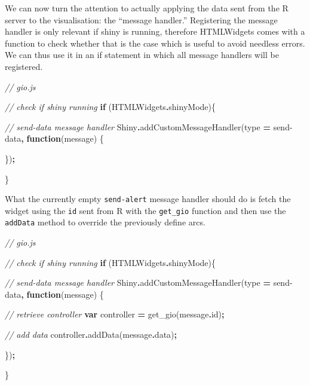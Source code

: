 \documentclass[
]{krantz}
\makeatletter
\newenvironment{Shaded}{\begin{snugshade}}{\end{snugshade}}
\newcommand{\AttributeTok}[1]{\textcolor[rgb]{0.61,0.61,0.61}{#1}}
\newcommand{\CommentTok}[1]{\textcolor[rgb]{0.37,0.37,0.37}{\textit{#1}}}
\newcommand{\ControlFlowTok}[1]{\textcolor[rgb]{0.27,0.27,0.27}{\textbf{#1}}}
\newcommand{\FunctionTok}[1]{\textcolor[rgb]{0,0,0}{#1}}
\newcommand{\KeywordTok}[1]{\textcolor[rgb]{0.27,0.27,0.27}{\textbf{#1}}}
\newcommand{\NormalTok}[1]{#1}
\newcommand{\OperatorTok}[1]{\textcolor[rgb]{0.43,0.43,0.43}{\textbf{#1}}}
\newcommand{\StringTok}[1]{\textcolor[rgb]{0.5,0.5,0.5}{#1}}
\newenvironment{kframe}{%
\medskip{}
\setlength{\fboxsep}{.8em}
 \def\at@end@of@kframe{}%
 \ifinner\ifhmode%
  \def\at@end@of@kframe{\end{minipage}}%
  \begin{minipage}{\columnwidth}%
 \fi\fi%
 \def\FrameCommand##1{\hskip\@totalleftmargin \hskip-\fboxsep
 \colorbox{shadecolor}{##1}\hskip-\fboxsep
     \hskip-\linewidth \hskip-\@totalleftmargin \hskip\columnwidth}%
 \MakeFramed {\advance\hsize-\width
   \@totalleftmargin\z@ \linewidth\hsize
   \@setminipage}}%
 {\par\unskip\endMakeFramed%
 \at@end@of@kframe}
\renewenvironment{Shaded}{\begin{kframe}}{\end{kframe}}
\makeatother
\begin{document}
We can now turn the attention to actually applying the data sent from the R server to the visualisation: the ``message handler.'' Registering the message handler is only relevant if shiny is running, therefore HTMLWidgets comes with a function to check whether that is the case which is useful to avoid needless errors. We can thus use it in an if statement in which all message handlers will be registered.

\begin{Shaded}
\begin{Highlighting}[]
\CommentTok{// gio.js}

\CommentTok{// check if shiny running}
\ControlFlowTok{if}\NormalTok{ (HTMLWidgets}\OperatorTok{.}\AttributeTok{shinyMode}\NormalTok{)\{}

  \CommentTok{// send{-}data message handler}
\NormalTok{  Shiny}\OperatorTok{.}\FunctionTok{addCustomMessageHandler}\NormalTok{(type }\OperatorTok{=} \StringTok{\textquotesingle{}send{-}data\textquotesingle{}}\OperatorTok{,} \KeywordTok{function}\NormalTok{(message) \{}

\NormalTok{  \})}\OperatorTok{;}

\NormalTok{\}}
\end{Highlighting}
\end{Shaded}

What the currently empty \texttt{send-alert} message handler should do is fetch the widget using the \texttt{id} sent from R with the \texttt{get\_gio} function and then use the \texttt{addData} method to override the previously define arcs.

\begin{Shaded}
\begin{Highlighting}[]
\CommentTok{// gio.js}

\CommentTok{// check if shiny running}
\ControlFlowTok{if}\NormalTok{ (HTMLWidgets}\OperatorTok{.}\AttributeTok{shinyMode}\NormalTok{)\{}

  \CommentTok{// send{-}data message handler}
\NormalTok{  Shiny}\OperatorTok{.}\FunctionTok{addCustomMessageHandler}\NormalTok{(type }\OperatorTok{=} \StringTok{\textquotesingle{}send{-}data\textquotesingle{}}\OperatorTok{,} \KeywordTok{function}\NormalTok{(message) \{}

    \CommentTok{// retrieve controller}
    \KeywordTok{var}\NormalTok{ controller }\OperatorTok{=}\NormalTok{ get\_gio(message}\OperatorTok{.}\AttributeTok{id}\NormalTok{)}\OperatorTok{;}

    \CommentTok{// add data}
\NormalTok{    controller}\OperatorTok{.}\FunctionTok{addData}\NormalTok{(message}\OperatorTok{.}\AttributeTok{data}\NormalTok{)}\OperatorTok{;}

\NormalTok{  \})}\OperatorTok{;}

\NormalTok{\}}
\end{Highlighting}
\end{Shaded}
\end{document}
